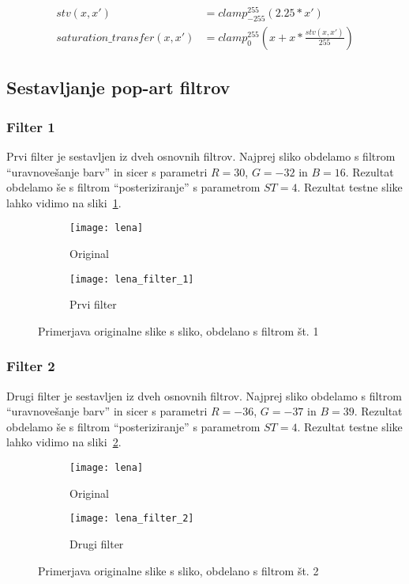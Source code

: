 \begin{align}
stv(x, x') &= clamp_{-255}^{255}(2.25 * x') \nonumber \\
saturation\_transfer(x, x') &= clamp_{0}^{255}(x + x * \frac{stv(x, x')}{255})
\end{align}


\subsection{Sestavljanje pop-art filtrov}
\label{sec:obdelavaSlikSestavljanjePopArt}

\subsubsection*{Filter 1}
Prvi filter je sestavljen iz dveh osnovnih filtrov. Najprej sliko obdelamo s
filtrom ``uravnovešanje barv'' in sicer s parametri $R = 30$, $G = -32$ in
$B = 16$. Rezultat obdelamo še s filtrom ``posteriziranje'' s parametrom
$ST =4$. Rezultat testne slike lahko vidimo na sliki~\ref{fig:lena_filter_1}.

\begin{figure}[!ht]
    \centering
    \begin{subfigure}[b]{0.4\textwidth}
        \texttt{[image: lena]}
        \caption{Original}
    \end{subfigure}
    \begin{subfigure}[b]{0.4\textwidth}
        \texttt{[image: lena\_filter\_1]}
        \caption{Prvi filter}
    \end{subfigure}
    \caption{Primerjava originalne slike s sliko, obdelano s filtrom št. 1}
    \label{fig:lena_filter_1}
\end{figure}


\subsubsection*{Filter 2}
Drugi filter je sestavljen iz dveh osnovnih filtrov. Najprej sliko obdelamo s
filtrom ``uravnovešanje barv'' in sicer s parametri $R = -36$, $G = -37$ in
$B = 39$. Rezultat obdelamo še s filtrom ``posteriziranje'' s parametrom
$ST = 4$. Rezultat testne slike lahko vidimo na sliki~\ref{fig:lena_filter_2}.

\begin{figure}[!ht]
    \centering
    \begin{subfigure}[b]{0.4\textwidth}
        \texttt{[image: lena]}
        \caption{Original}
    \end{subfigure}
    \begin{subfigure}[b]{0.4\textwidth}
        \texttt{[image: lena\_filter\_2]}
        \caption{Drugi filter}
    \end{subfigure}
    \caption{Primerjava originalne slike s sliko, obdelano s filtrom št. 2}
    \label{fig:lena_filter_2}
\end{figure}



